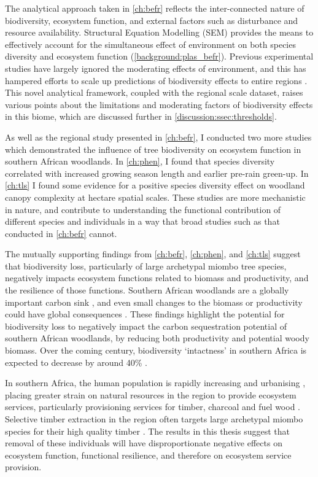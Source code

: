 \begin{refsection}
The analytical approach taken in \autoref{ch:befr} reflects the inter-connected nature of biodiversity, ecosystem function, and external factors such as disturbance and resource availability. Structural Equation Modelling (SEM) provides the means to effectively account for the simultaneous effect of environment on both species diversity and ecosystem function (\autoref{background:plas_befr}). Previous experimental studies have largely ignored the moderating effects of environment, and this has hampered efforts to scale up predictions of biodiversity effects to entire regions \citep{Thompson2021}. This novel analytical framework, coupled with the regional scale dataset, raises various points about the limitations and moderating factors of biodiversity effects in this biome, which are discussed further in \autoref{discussion:ssec:thresholds}.

As well as the regional study presented in \autoref{ch:befr}, I conducted two more studies which demonstrated the influence of tree biodiversity on ecosystem function in southern African woodlands. In \autoref{ch:phen}, I found that species diversity correlated with increased growing season length and earlier pre-rain green-up. In \autoref{ch:tls} I found some evidence for a positive species diversity effect on woodland canopy complexity at hectare spatial scales. These studies are more mechanistic in nature, and contribute to understanding the functional contribution of different species and individuals in a way that broad studies such as that conducted in \autoref{ch:befr} cannot. 

The mutually supporting findings from \autoref{ch:befr}, \autoref{ch:phen}, and \autoref{ch:tls} suggest that biodiversity loss, particularly of large archetypal miombo tree species, negatively impacts ecosystem functions related to biomass and productivity, and the resilience of those functions. Southern African woodlands are a globally important carbon sink \citep{Grace2006, Pelletier2018}, and even small changes to the biomass or productivity could have global consequences \citep{Williams2005}. These findings highlight the potential for biodiversity loss to negatively impact the carbon sequestration potential of southern African woodlands, by reducing both productivity and potential woody biomass. Over the coming century, biodiversity `intactness' in southern Africa is expected to decrease by around 40\% \citep{Biggs2008}.

In southern Africa, the human population is rapidly increasing and urbanising \citep{UN2018}, placing greater strain on natural resources in the region to provide ecosystem services, particularly provisioning services for timber, charcoal and fuel wood \citep{Wessels2013, Ryan2016}. Selective timber extraction in the region often targets large archetypal miombo species for their high quality timber \citep{Sitoe2010}. The results in this thesis suggest that removal of these individuals will have disproportionate negative effects on ecosystem function, functional resilience, and therefore on ecosystem service provision. 


\end{refsection}
